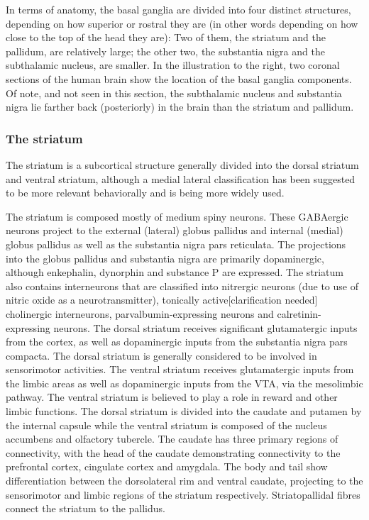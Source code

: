 In terms of anatomy, the basal ganglia are divided into four distinct structures, depending on how superior or rostral they are (in other words depending on how close to the top of the head they are): Two of them, the striatum and the pallidum, are relatively large; the other two, the substantia nigra and the subthalamic nucleus, are smaller. In the illustration to the right, two coronal sections of the human brain show the location of the basal ganglia components. Of note, and not seen in this section, the subthalamic nucleus and substantia nigra lie farther back (posteriorly) in the brain than the striatum and pallidum.

\hypertarget{the-striatum}{%
\subsubsection{The striatum}\label{the-striatum}}

The striatum is a subcortical structure generally divided into the dorsal striatum and ventral striatum, although a medial lateral classification has been suggested to be more relevant behaviorally and is being more widely used.

The striatum is composed mostly of medium spiny neurons. These GABAergic neurons project to the external (lateral) globus pallidus and internal (medial) globus pallidus as well as the substantia nigra pars reticulata. The projections into the globus pallidus and substantia nigra are primarily dopaminergic, although enkephalin, dynorphin and substance P are expressed. The striatum also contains interneurons that are classified into nitrergic neurons (due to use of nitric oxide as a neurotransmitter), tonically active{[}clarification needed{]} cholinergic interneurons, parvalbumin-expressing neurons and calretinin-expressing neurons. The dorsal striatum receives significant glutamatergic inputs from the cortex, as well as dopaminergic inputs from the substantia nigra pars compacta. The dorsal striatum is generally considered to be involved in sensorimotor activities. The ventral striatum receives glutamatergic inputs from the limbic areas as well as dopaminergic inputs from the VTA, via the mesolimbic pathway. The ventral striatum is believed to play a role in reward and other limbic functions. The dorsal striatum is divided into the caudate and putamen by the internal capsule while the ventral striatum is composed of the nucleus accumbens and olfactory tubercle. The caudate has three primary regions of connectivity, with the head of the caudate demonstrating connectivity to the prefrontal cortex, cingulate cortex and amygdala. The body and tail show differentiation between the dorsolateral rim and ventral caudate, projecting to the sensorimotor and limbic regions of the striatum respectively. Striatopallidal fibres connect the striatum to the pallidus.

